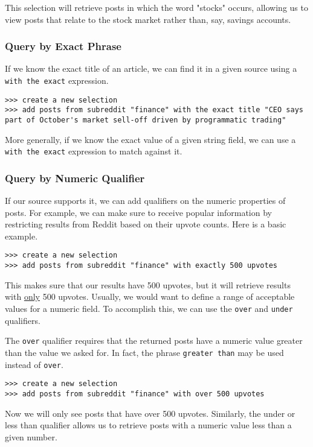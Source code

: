 This selection will retrieve posts in which the word "stocks" occurs, allowing us to view posts that relate to the stock market rather than, say, savings accounts.


\subsubsection{Query by Exact Phrase}
If we know the exact title of an article, we can find it in a given source using a \texttt{with the exact} expression.
\newline\begin{minipage}{\linewidth}\begin{lstlisting}
>>> create a new selection
>>> add posts from subreddit "finance" with the exact title "CEO says part of October's market sell-off driven by programmatic trading"
\end{lstlisting}\end{minipage}

More generally, if we know the exact value of a given string field, we can use a \texttt{with the exact} expression to match against it.



\subsubsection{Query by Numeric Qualifier}
If our source supports it, we can add qualifiers on the numeric properties of posts. For example, we can make sure to receive popular information by restricting results from Reddit based on their upvote counts. Here is a basic example.
\newline\begin{minipage}{\linewidth}\begin{lstlisting}
>>> create a new selection
>>> add posts from subreddit "finance" with exactly 500 upvotes
\end{lstlisting}\end{minipage}
This makes sure that our results have 500 upvotes, but it will retrieve results with \underline{only} 500 upvotes. Usually, we would want to define a range of acceptable values for a numeric field. To accomplish this, we can use the \texttt{over} and \texttt{under} qualifiers.

The \texttt{over} qualifier requires that the returned posts have a numeric value greater than the value we asked for. In fact, the phrase \texttt{greater than} may be used instead of \texttt{over}.
\newline\begin{minipage}{\linewidth}\begin{lstlisting}
>>> create a new selection
>>> add posts from subreddit "finance" with over 500 upvotes
\end{lstlisting}\end{minipage}
Now we will only see posts that have over 500 upvotes. Similarly, the under or less than qualifier allows us to retrieve posts with a numeric value less than a given number.


